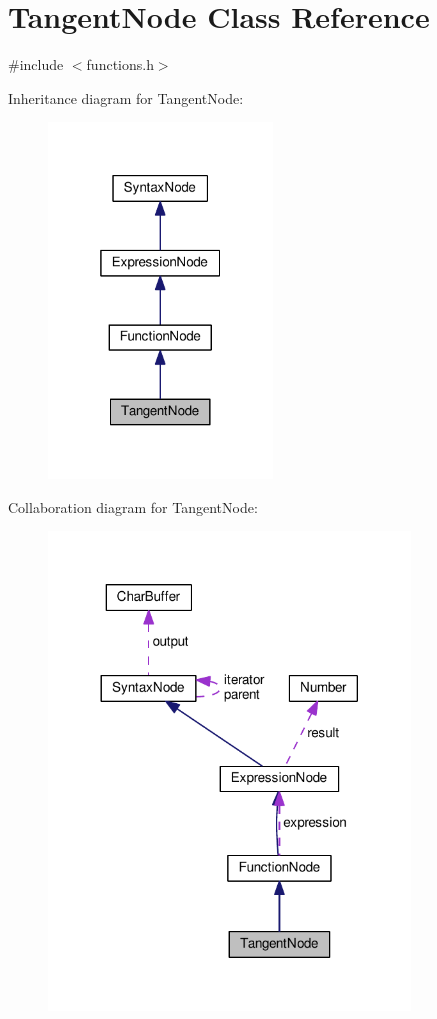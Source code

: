 \hypertarget{classTangentNode}{}\section{Tangent\+Node Class Reference}
\label{classTangentNode}


{\ttfamily \#include $<$functions.\+h$>$}



Inheritance diagram for Tangent\+Node\+:
\nopagebreak
\begin{figure}[H]
\begin{center}
\leavevmode
\includegraphics[width=169pt]{d2/d1f/classTangentNode__inherit__graph}
\end{center}
\end{figure}


Collaboration diagram for Tangent\+Node\+:
\nopagebreak
\begin{figure}[H]
\begin{center}
\leavevmode
\includegraphics[width=272pt]{d9/d4f/classTangentNode__coll__graph}
\end{center}
\end{figure}
